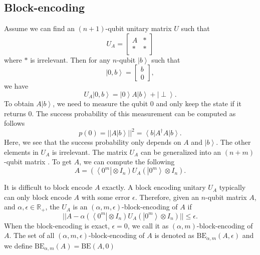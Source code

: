 \documentclass[11pt]{article}
\newcommand{\bra}[1]{\left\langle #1\right|}
\newcommand{\ket}[1]{\left|#1\right\rangle}
\begin{document}
\subsection{Block-encoding}
Assume we can find an $(n+1)$-qubit unitary matrix $U$ such that 
\begin{equation}
    U_A = \begin{bmatrix}
        A & * \\
        * & *
    \end{bmatrix}
\end{equation}
where $*$ is irrelevant. Then for any $n$-qubit $\ket{b}$ such that 
\begin{equation}
    \ket{0,b} = \begin{bmatrix}
        b \\
        0
    \end{bmatrix},
\end{equation}
we have 
\begin{equation}
    U_A\ket{0,b} = \ket{0}A\ket{b} + \ket{\perp}.
\end{equation}
To obtain $A\ket{b}$, we need to measure the qubit 0 and only keep the state if it returns 0. The success probability of this measurement can be computed as follows 
\begin{equation}
    p(0) = ||A\ket{b}||^2 = \bra{b}A^\dagger A\ket{b}.
\end{equation}
Here, we see that the success probability only depends on $A$ and $\ket{b}$. The other elements in $U_A$ is irrelevant. The matrix $U_A$ can be generalized into an $(n+m)$-qubit matrix . To get $A$, we can compute the following 
\begin{equation}
    A = (\bra{0^m}\otimes I_n)U_A(\ket{0^m}\otimes I_n).
\end{equation}

It is difficult to block encode $A$ exactly. A block encoding unitary $U_A$ typically can only block encode $A$ with some error $\epsilon$. Therefore, given an $n$-qubit matrix $A$, and $\alpha,\epsilon\in\mathbb{R}_{+}$, the $U_A$ is an $(\alpha,m,\epsilon)$-block-encoding of $A$ if 
\begin{equation}
    ||A - \alpha(\bra{0^m}\otimes I_n)U_A(\ket{0^m}\otimes I_n)|| \leq \epsilon.
\end{equation}
When the block-encoding is exact, $\epsilon = 0$, we call it as $(\alpha,m)$-block-encoding of $A$. The set of all $(\alpha,m,\epsilon)$-block-encoding of $A$ is denoted as $\text{BE}_{\alpha,m}(A,\epsilon)$ and we define $\text{BE}_{\alpha,m}(A) = \text{BE}(A,0)$
\end{document}
